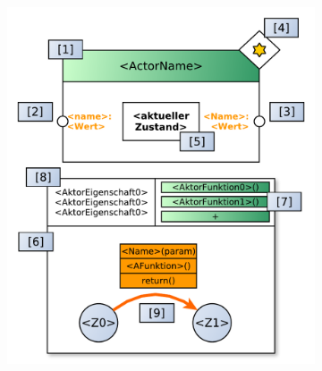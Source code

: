 \begin{figure}[h]
\centering
\begin{subfigure}{.55\textwidth}
  \centering
  \includegraphics[width=1\linewidth]{bilder/chapter4/chapter4_3/genericactornode.pdf}
  \caption{}
  \label{fig:actorgeneric}
\end{subfigure}%
\begin{subfigure}{.55\textwidth}
  \centering

\end{subfigure}
\end{figure}
